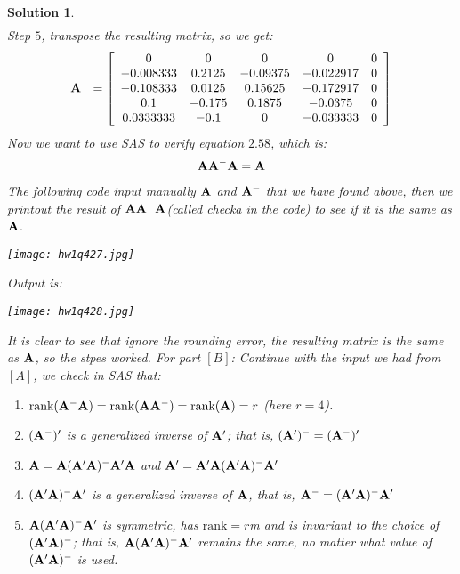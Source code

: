 \documentclass[11pt]{article}\usepackage[]{graphicx}\usepackage[]{color}
\newtheorem{sol}{Solution}
\begin{document}
\begin{sol}
\begin{align*}
	\end{align*}
	Step $5$, transpose the resulting matrix, so we get:
	\begin{align*}
		{\bf A}^- =\left[\begin{array}{ccccc}0 &0&0&0&0\\-0.008333 &0.2125&-0.09375&-0.022917&0\\-0.108333 &0.0125&0.15625&-0.172917&0\\ 0.1&-0.175&0.1875&-0.0375&0\\ 0.0333333&-0.1&0&-0.033333&0 \end{array}\right]
	\end{align*}
	Now we want to use SAS to verify equation $2.58$, which is:
	\begin{align*}
		{\bf A}{\bf A}^-{\bf A}  = {\bf A}
	\end{align*}
	The following code input manually ${\bf A}$ and ${\bf A}^-$ that we have found above, then we printout the result of ${\bf A}{\bf A}^-{\bf A}$(called checka in the code) to see if it is the same as ${\bf A}$.
	\begin{center}
		\texttt{[image: hw1q427.jpg]}
	\end{center}
	Output is:
	\begin{center}
		\texttt{[image: hw1q428.jpg]}
	\end{center}
	It is clear to see that ignore the rounding error, the resulting matrix is the same as ${\bf A}$, so the stpes worked.\vskip 2mm
	For part $[B]$:\vskip 2mm
	Continue with the input we had from $[A]$, we check in SAS that:
	\begin{enumerate}
		\item [(i)] $\text{rank}({\bf A}^-{\bf A}) = \text{rank}({\bf A}{\bf A}^-) = \text{rank}({\bf A}) = r$ (here $r = 4$).
		\item [(ii)] $({\bf A}^-)'$ is a generalized inverse of ${\bf A}'$; that is, $({\bf A}')^- = ({\bf A}^-)'$
		\item [(iii)]${\bf A} = {\bf A}({\bf A}'{\bf A})^-{\bf A}'{\bf A}$ and ${\bf A}' = {\bf A}'{\bf A}({\bf A}'{\bf A})^-{\bf A}'$
		\item [(iv)]$({\bf A}'{\bf A})^-{\bf A}'$ is a generalized inverse of ${\bf A}$, that is, ${\bf A}^- = ({\bf A}'{\bf A})^-{\bf A}'$
		\item [(v)] ${\bf A}({\bf A}'{\bf A})^-{\bf A}'$ is symmetric, has $\text{rank} = r$m and is invariant to the choice of $({\bf A}'{\bf A})^-$; that is, ${\bf A}({\bf A}'{\bf A})^-{\bf A}'$ remains the same, no matter what value of $({\bf A}'{\bf A})^-$ is used.

\end{enumerate}
\end{sol}
\end{document}
